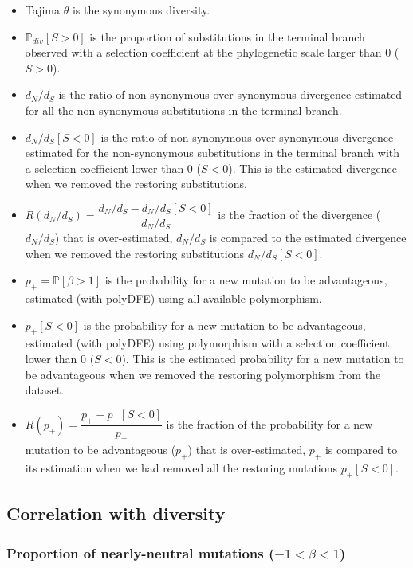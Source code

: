 \documentclass{article}
\newcommand{\proba}{\mathbb{P}}
\newcommand{\dn}{d_N}
\newcommand{\ds}{d_S}
\newcommand{\dnds}{\dn / \ds}
\newcommand{\Sphy}{S}
\newcommand{\Spop}{\beta}
\newcommand{\polyNeutral}{-1 < \Spop < 1}
\newcommand{\polyAdv}{ \Spop > 1}
\newcommand{\PpolyAdv}{\proba \left[ \polyAdv \right]}
\begin{document}
    \begin{itemize}
        \item Tajima $\theta$ is the synonymous diversity.
        \item $\mathbb{P}_{div}[\Sphy > 0]$ is the proportion of substitutions in the terminal branch observed with a selection coefficient at the phylogenetic scale larger than 0 ($\Sphy > 0$).
        \item $\dnds$ is the ratio of non-synonymous over synonymous divergence estimated for all the non-synonymous substitutions in the terminal branch.
        \item $\dnds[\Sphy < 0]$ is the ratio of non-synonymous over synonymous divergence estimated for the non-synonymous substitutions in the terminal branch with a selection coefficient lower than 0 ($\Sphy < 0$).
        This is the estimated divergence when we removed the restoring substitutions.
        \item $R(\dnds)=\dfrac{\dnds - \dnds[\Sphy < 0]}{\dnds}$ is the fraction of the divergence ($\dnds$) that is over-estimated, $\dnds$ is compared to the estimated divergence when we removed the restoring substitutions $\dnds[\Sphy < 0]$.
        \item $p_+=\PpolyAdv$ is the probability for a new mutation to be advantageous, estimated (with polyDFE) using all available polymorphism.
        \item $p_+[\Sphy < 0]$ is the probability for a new mutation to be advantageous, estimated (with polyDFE) using polymorphism with a selection coefficient lower than 0 ($\Sphy < 0$).
        This is the estimated probability for a new mutation to be advantageous when we removed the restoring polymorphism from the dataset.
        \item $R(p_+)=\dfrac{p_+ - p_+[\Sphy < 0]}{p_+}$ is the fraction of the probability for a new mutation to be advantageous ($p_+$) that is over-estimated, $p_+$ is compared to its estimation when we had removed all the restoring mutations $p_+[\Sphy < 0]$.
    \end{itemize}

    \subsection{Correlation with diversity}

    \subsubsection{Proportion of nearly-neutral mutations ($\polyNeutral$)}\label{subsec:proportion-nearly-neutral-mutations}
\end{document}
